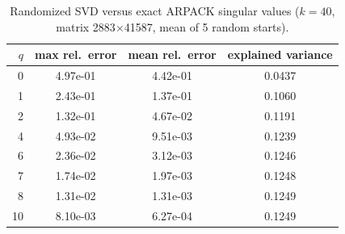 \begin{table}[htbp]
\centering
\small
\caption{Randomized SVD versus exact ARPACK singular values ($k=40$, matrix 2883$\times$41587, mean of 5 random starts).}
\label{tab:svd}
\begin{tabular}{rccc}
\toprule
$q$ & max rel.\ error & mean rel.\ error & explained variance \\
\midrule
0 & 4.97e-01 & 4.42e-01 & 0.0437 \\
1 & 2.43e-01 & 1.37e-01 & 0.1060 \\
2 & 1.32e-01 & 4.67e-02 & 0.1191 \\
4 & 4.93e-02 & 9.51e-03 & 0.1239 \\
6 & 2.36e-02 & 3.12e-03 & 0.1246 \\
7 & 1.74e-02 & 1.97e-03 & 0.1248 \\
8 & 1.31e-02 & 1.31e-03 & 0.1249 \\
10 & 8.10e-03 & 6.27e-04 & 0.1249 \\
\bottomrule
\end{tabular}
\end{table}
